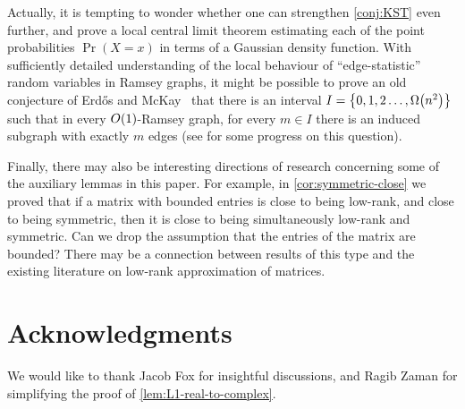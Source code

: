 \documentclass{daj}
\theoremstyle{plain}
\theoremstyle{plain}
\theoremstyle{plain}
\theoremstyle{plain}
\theoremstyle{definition}
\theoremstyle{plain}
\theoremstyle{plain}
\theoremstyle{definition}
\theoremstyle{definition}
\theoremstyle{plain}
\let\originalleft\left
\let\originalright\right
\renewcommand{\left}{\mathopen{}\mathclose\bgroup\originalleft}
\renewcommand{\right}{\aftergroup\egroup\originalright}
\begin{document}
Actually, it is tempting to wonder whether one can strengthen \cref{conj:KST} even further, and prove a local central limit theorem estimating each of the point probabilities $\Pr(X=x)$ in terms of a Gaussian density function. With sufficiently
detailed understanding of the local behaviour of ``edge-statistic'' random variables in Ramsey graphs,
it might be possible to prove an old conjecture of Erd\H os and McKay~\cite{Erd92,Erd97}
that there is an interval $I=\left\{ 0,1,2\dots,\Omega\left(n^{2}\right)\right\} $
such that in every $O\left(1\right)$-Ramsey graph, for every $m\in I$
there is an induced subgraph with exactly $m$ edges (see \cite{AKS03}
for some progress on this question).

Finally, there may also be interesting directions of research concerning some of the auxiliary lemmas in this paper. For example, in \cref{cor:symmetric-close} we proved that if a matrix with bounded entries is close to being low-rank, and close to being symmetric, then it is close to being simultaneously low-rank and symmetric. Can we drop the assumption that the entries of the matrix are bounded? There may be a connection between results of this type and the existing literature on low-rank approximation of matrices.


\section*{Acknowledgments} %
We would like to thank Jacob Fox for insightful discussions, and Ragib Zaman for simplifying the proof of \cref{lem:L1-real-to-complex}.
\end{document}
